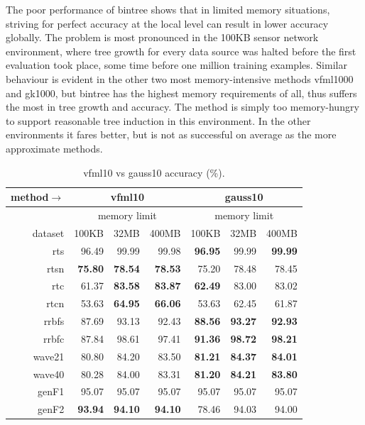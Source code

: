 The poor performance of {\sc bintree} shows that in limited memory situations, striving for perfect accuracy at the local level can result in lower accuracy globally. The problem is most pronounced in the 100KB sensor network environment, where tree growth for every data source was halted before the first evaluation took place, some time before one million training examples. 
Similar behaviour is evident in the other two most memory-intensive methods {\sc vfml1000} and {\sc gk1000}, but {\sc bintree} has the highest memory requirements of all, thus suffers the most in tree growth and accuracy.
The method is simply too memory-hungry to support reasonable tree induction in this environment. In the other environments it fares better, but is not as successful on average as the more approximate methods.

\begin{table}
\caption{{\sc vfml10} vs {\sc gauss10} accuracy (\%).}
\label{tab:vfml10_vs_gauss10_acc}
\centering
\begin{tabular}{|r||r|r|r||r|r|r|}
\hline
method$\rightarrow$ & \multicolumn{3}{|c||}{{\sc vfml10}} & \multicolumn{3}{|c|}{{\sc gauss10}} \\
\hline
 & \multicolumn{3}{|c||}{memory limit} & \multicolumn{3}{|c|}{memory limit} \\
\hline
dataset & 100KB & 32MB & 400MB & 100KB & 32MB & 400MB \\
\hline
{\sc rts} & 96.49 & 99.99 & 99.98 & \textbf{96.95} & 99.99 & \textbf{99.99} \\
{\sc rtsn} & \textbf{75.80} & \textbf{78.54} & \textbf{78.53} & 75.20 & 78.48 & 78.45 \\
{\sc rtc} & 61.37 & \textbf{83.58} & \textbf{83.87} & \textbf{62.49} & 83.00 & 83.02 \\
{\sc rtcn} & 53.63 & \textbf{64.95} & \textbf{66.06} & 53.63 & 62.45 & 61.87 \\
{\sc rrbfs} & 87.69 & 93.13 & 92.43 & \textbf{88.56} & \textbf{93.27} & \textbf{92.93} \\
{\sc rrbfc} & 87.84 & 98.61 & 97.41 & \textbf{91.36} & \textbf{98.72} & \textbf{98.21} \\
{\sc wave21} & 80.80 & 84.20 & 83.50 & \textbf{81.21} & \textbf{84.37} & \textbf{84.01} \\
{\sc wave40} & 80.28 & 84.00 & 83.31 & \textbf{81.20} & \textbf{84.21} & \textbf{83.80} \\
{\sc genF1} & 95.07 & 95.07 & 95.07 & 95.07 & 95.07 & 95.07 \\
{\sc genF2} & \textbf{93.94} & \textbf{94.10} & \textbf{94.10} & 78.46 & 94.03 & 94.00 \\

\end{tabular}
\end{table}
